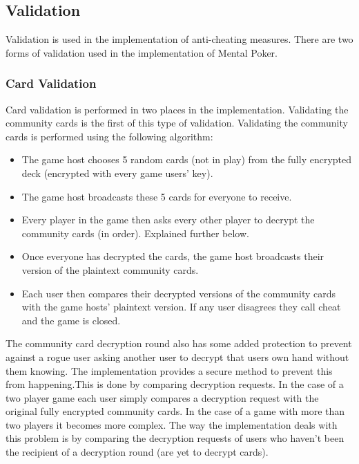 \documentclass[11pt, oneside]{article}   	%
\begin{document}
\subsection{Validation}
\label{sec:validation}

Validation is used in the implementation of anti-cheating measures. There are two forms of validation used in the implementation of Mental Poker.

\subsubsection{Card Validation}

Card validation is performed in two places in the implementation. Validating the community cards is the first of this type of validation. Validating the community cards is performed using the following algorithm:

\begin{itemize}
\renewcommand{\labelitemi}{$\bullet$}
\item The game host chooses 5 random cards (not in play) from the fully encrypted deck (encrypted with every game users’ key).
\item The game host broadcasts these 5 cards for everyone to receive.
\item Every player in the game then asks every other player to decrypt the community cards (in order). Explained further below.
\item Once everyone has decrypted the cards, the game host broadcasts their version of the plaintext community cards.
\item Each user then compares their decrypted versions of the community cards with the game hosts’ plaintext version. If any user disagrees they call cheat and the game is closed.
\end{itemize}

The community card decryption round also has some added protection to prevent against a rogue user asking another user to decrypt that users own hand without them knowing. The implementation provides a secure method to prevent this from happening.This is done by comparing decryption requests. In the case of a two player game each user simply compares a decryption request with the original fully encrypted community cards. In the case of a game with more than two players it becomes more complex. The way the implementation deals with this problem is by comparing the decryption requests of users who haven't been the recipient of a decryption round (are yet to decrypt cards).\\
\end{document}
